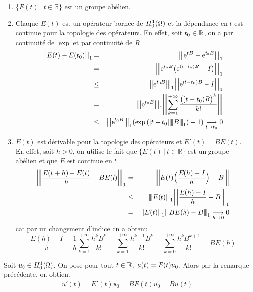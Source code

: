 \begin{remark}\label{remarque_operateur}
    \begin{enumerate}
        \item \label{E_groupe_abelien} $\{ E(t) \ | \ t \in \mathbb{R} \}$ est un groupe abélien. 
        \item Chaque $E(t)$ est un opérateur bornée de $H^1_0(\Omega)$ et la dépendance en $t$ est continue pour la topologie des opérateurs. En effet, soit 
        $t_0 \in \mathbb{R}$, on a par continuité de $\exp$ et par continuité de $B$
        \begin{eqnarray*}
            \vertiii{E(t)-E(t_0)}_1 &=& \vertiii{\ex^{tB}-\ex^{t_0B}}_1 \\
            &=& \vertiii{\ex^{t_0B}\big(\ex^{(t-t_0)B}-I\big)}_1 \\
            &\leq& \vertiii{\ex^{t_0B}}_1\vertiii{\ex^{(t-t_0)B}-I}_1 \\
            &=& \vertiii{\ex^{t_0B}}_1 \vertiii{\sum_{k=1}^{+\infty}\frac{\big((t-t_0)B\big)^k}{k!}} \\
            &\leq& \vertiii{\ex^{t_0B}}_1 (\exp{(|t-t_0|\vertiii{B}_1)}-1)\underset{t \to t_0}{\longrightarrow} 0
        \end{eqnarray*}
        \item $E(t)$ est dérivable pour la topologie des opérateurs et $E'(t) = B E(t)$. En effet, soit $h>0$, on utilise le fait que $\{ E(t) \ | \ t \in \mathbb{R} \}$ est un groupe abélien et que $E$ est continue en $t$
        \begin{eqnarray*}
            \vertiii{\frac{E(t+h)-E(t)}{h}-BE(t)}_1 &=& \vertiii{E(t)\Big(\frac{E(h)-I}{h}\Big)-B} \\
            &\leq& \vertiii{E(t)}_1 \vertiii{\frac{E(h)-I}{h}-B}_1 \\
            &=& \vertiii{E(t)}_1 \vertiii{BE(h)-B}_1\underset{h \to 0}{\longrightarrow} 0
        \end{eqnarray*}
        car par un changement d'indice on a obtenu
        \begin{equation*}
            \frac{E(h)-I}{h} = \frac{1}{h}\sum_{k=1}^{+\infty} \frac{h^kB^k}{k!} = \sum_{k=1}^{+\infty} \frac{h^{k-1}B^k}{k!} = \sum_{k=0}^{+\infty}\frac{h^kB^{k+1}}{k!} = BE(h)
        \end{equation*}
    \end{enumerate}
\end{remark}
Soit $u_0 \in H^1_0(\Omega)$. On pose pour tout $t \in \mathbb{R},\ u(t) = E(t)u_0$.
Alors par la remarque précédente, on obtient
\begin{eqnarray*}
    u'(t) = E'(t)u_0 = B E(t)u_0 = Bu(t)
\end{eqnarray*}

